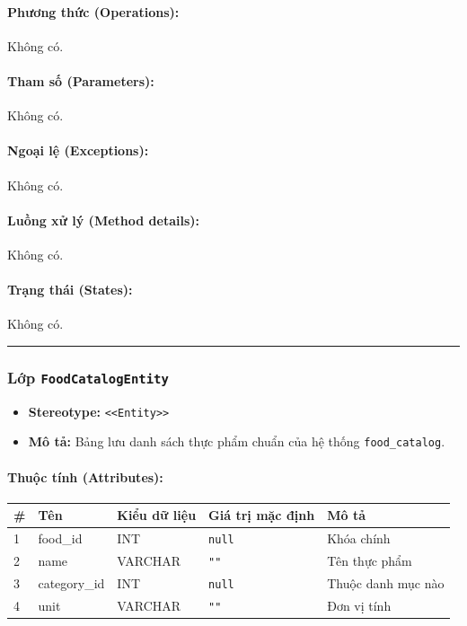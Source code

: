 \documentclass[12pt,a4paper]{article}
\begin{document}
\paragraph{Phương thức (Operations):}
Không có.

\paragraph{Tham số (Parameters):}
Không có.

\paragraph{Ngoại lệ (Exceptions):}
Không có.

\paragraph{Luồng xử lý (Method details):}
Không có.

\paragraph{Trạng thái (States):}
Không có.

\vskip 0.5cm
\noindent\rule{\textwidth}{0.5pt}
\vskip 0.5cm

\subsubsection{Lớp \texttt{FoodCatalogEntity}}

\begin{itemize}[leftmargin=*]
    \item \textbf{Stereotype:} \texttt{\textless{}\textless{}Entity\textgreater{}\textgreater{}}
    \item \textbf{Mô tả:} Bảng lưu danh sách thực phẩm chuẩn của hệ thống \texttt{food\_catalog}.
\end{itemize}

\paragraph{Thuộc tính (Attributes):}
\begin{longtable}{|p{0.6cm}|p{3.5cm}|p{2.4cm}|p{1.8cm}|p{5.1cm}|}
\hline
\textbf{\#} & \textbf{Tên} & \textbf{Kiểu dữ liệu} & \textbf{Giá trị mặc định} & \textbf{Mô tả} \\ \hline
\endhead
1 & food\_id & INT & \texttt{null} & Khóa chính \\ \hline
2 & name & VARCHAR & \texttt{""} & Tên thực phẩm \\ \hline
3 & category\_id & INT & \texttt{null} & Thuộc danh mục nào \\ \hline
4 & unit & VARCHAR & \texttt{""} & Đơn vị tính \\ \hline
\end{longtable}
\end{document}
